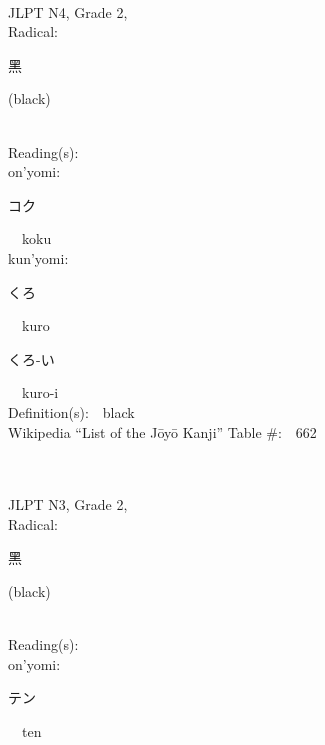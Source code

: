 \begin{multicols}{2}
{\fontsize{34pt}{40pt}  }\ \ \\  %
{JLPT N4, Grade 2, \\Radical:\ \ {\begin{CJK}{UTF8}{min} 黑 \end{CJK}} (black) } \\
Reading(s):\ \ \\
{\hspace*{1em}}on'yomi:\ \ \\
{\hspace*{2em}}{\begin{CJK}{UTF8}{min} コク \end{CJK}}\ \ koku\ \ \\
{\hspace*{1em}}kun'yomi:\ \ \\
{\hspace*{2em}}{\begin{CJK}{UTF8}{min} くろ \end{CJK}}\ \ kuro\ \ \\
{\hspace*{2em}}{\begin{CJK}{UTF8}{min} くろ-い \end{CJK}}\ \ kuro-i\ \ \\
Definition(s):\ \ black \\
Wikipedia ``List of the J\=oy\=o Kanji'' Table \#:\ \ 662 \\
\ \ \\
{\fontsize{34pt}{40pt}  }\ \ \\  %
{JLPT N3, Grade 2, \\Radical:\ \ {\begin{CJK}{UTF8}{min} 黑 \end{CJK}} (black) } \\
Reading(s):\ \ \\
{\hspace*{1em}}on'yomi:\ \ \\
{\hspace*{2em}}{\begin{CJK}{UTF8}{min} テン \end{CJK}}\ \ ten\ \ \\

\end{multicols}
